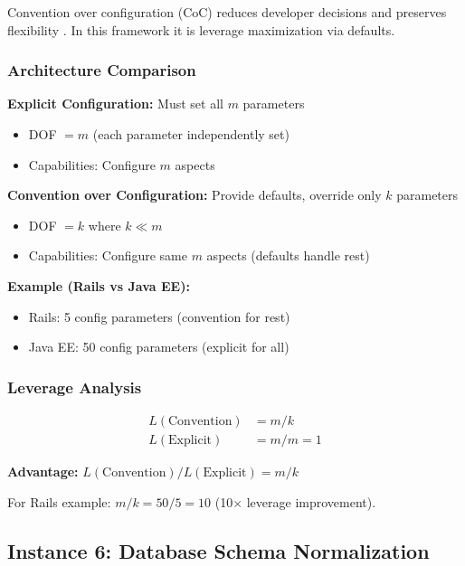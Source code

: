 Convention over configuration (CoC) reduces developer decisions and preserves
flexibility \cite{hansson2005rails}. In this framework it is leverage
maximization via defaults.

\subsubsection{Architecture Comparison}

\textbf{Explicit Configuration:} Must set all $m$ parameters
\begin{itemize}
\item DOF $= m$ (each parameter independently set)
\item Capabilities: Configure $m$ aspects
\end{itemize}

\textbf{Convention over Configuration:} Provide defaults, override only $k$ parameters
\begin{itemize}
\item DOF $= k$ where $k \ll m$
\item Capabilities: Configure same $m$ aspects (defaults handle rest)
\end{itemize}

\textbf{Example (Rails vs Java EE):}
\begin{itemize}
\item Rails: 5 config parameters (convention for rest)
\item Java EE: 50 config parameters (explicit for all)
\end{itemize}

\subsubsection{Leverage Analysis}

\begin{align*}
L(\text{Convention}) &= m / k \\
L(\text{Explicit}) &= m / m = 1
\end{align*}

\textbf{Advantage:} $L(\text{Convention}) / L(\text{Explicit}) = m/k$

For Rails example: $m/k = 50/5 = 10$ (10$\times$ leverage improvement).

\subsection{Instance 6: Database Schema Normalization}


